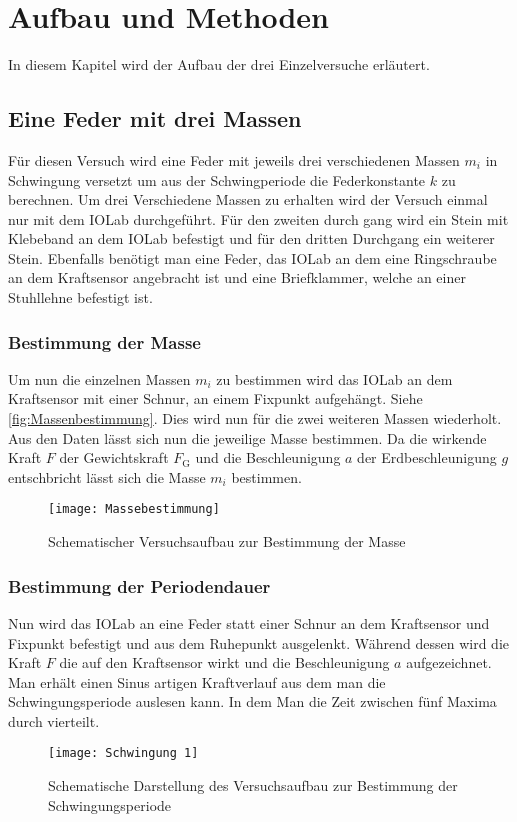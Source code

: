 
\chapter{Aufbau und Methoden}
\label{sec:aufbau}
In diesem Kapitel wird der Aufbau der drei Einzelversuche erläutert.
\section{Eine Feder mit drei Massen}
Für diesen Versuch wird eine Feder mit jeweils drei verschiedenen Massen $m_i$ in Schwingung versetzt um aus der Schwingperiode die Federkonstante $k$ zu berechnen. Um drei Verschiedene Massen zu erhalten wird der Versuch einmal nur mit dem IOLab durchgeführt. Für den zweiten durch gang wird ein Stein mit Klebeband an dem IOLab befestigt und für den dritten Durchgang ein weiterer Stein. Ebenfalls benötigt man eine Feder, das IOLab an dem eine Ringschraube an dem Kraftsensor angebracht ist und eine Briefklammer, welche an einer Stuhllehne befestigt ist.
\subsection{Bestimmung der Masse}
Um nun die einzelnen Massen $m_i$ zu bestimmen wird das IOLab an dem Kraftsensor mit einer Schnur, an einem Fixpunkt aufgehängt. Siehe \autoref{fig:Massenbestimmung}. Dies wird nun für die zwei weiteren Massen wiederholt. Aus den Daten lässt sich nun die jeweilige Masse bestimmen. Da die wirkende Kraft $F$ der Gewichtskraft $F_{\text{G}}$ und die Beschleunigung $a$ der Erdbeschleunigung $g$ entschbricht lässt sich die Masse $m_i$ bestimmen.
\begin{figure}[H]
	\centering
	\texttt{[image: Massebestimmung]}
	\caption[Versuchsaufbau der Massebestimmung]{Schematischer Versuchsaufbau zur Bestimmung der Masse}
	\label{fig:Massenbestimmung}
\end{figure}
\subsection{Bestimmung der Periodendauer}
Nun wird das IOLab an eine Feder statt einer Schnur an dem Kraftsensor und Fixpunkt befestigt und aus dem Ruhepunkt ausgelenkt. Während dessen wird die Kraft $F$ die auf den Kraftsensor wirkt und die Beschleunigung $a$ aufgezeichnet. Man erhält einen Sinus artigen Kraftverlauf aus dem man die Schwingungsperiode auslesen kann. In dem Man die Zeit zwischen fünf Maxima durch vierteilt.
\begin{figure}[H]
	\centering
	\texttt{[image: Schwingung 1]}
	\caption[Versuchsaufbau für eine Feder]{Schematische Darstellung des Versuchsaufbau zur Bestimmung der Schwingungsperiode}
	\label{fig:Schwingungsperiode1}
\end{figure}
